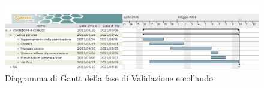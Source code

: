 \begin{figure}[H]
    \centering
    \includegraphics[width=1\linewidth]{res/images/pianificazione/validazione_e_collaudo.png}
    \caption{Diagramma di Gantt della fase di Validazione e collaudo}
    \label{fig:_Gantt Validazione e collaudo}
\end{figure}

